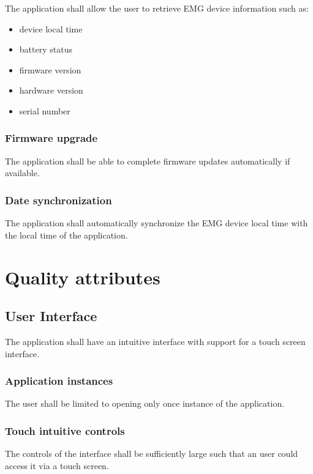 \documentclass[12pt,a4paper]{article}
\begin{document}
The application shall allow the user to retrieve EMG device information such as: 

\begin{itemize}
\item device local time
\item battery status
\item firmware version
\item hardware version
\item serial number
\end{itemize}

\subsubsection{Firmware upgrade}

The application shall be able to complete firmware updates automatically if available.

\subsubsection{Date synchronization}

The application shall automatically synchronize the EMG device local time with the local time of the application.

\newpage

\section{Quality attributes}

\subsection{User Interface}

The application shall have an intuitive interface with support for a touch screen interface.

\subsubsection{Application instances}

The user shall be limited to opening only once instance of the application.

\subsubsection{Touch intuitive controls}

The controls of the interface shall be sufficiently large such that an user could access it via a touch screen.
\end{document}
